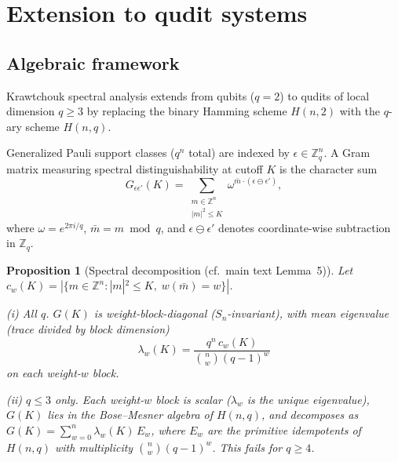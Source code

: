 \documentclass[twocolumn,prx,aps,superscriptaddress,longbibliography]{revtex4-2}
\newtheorem{proposition}{Proposition}
\newcommand{\pclaim}[4]{}
\begin{document}


\section{Extension to qudit systems}
\label{sec:qudit}

\subsection{Algebraic framework}
\label{sec:qudit-framework}

Krawtchouk spectral analysis extends from qubits ($q = 2$) to qudits
of local dimension $q \geq 3$ by replacing the binary Hamming
scheme $H(n,2)$ with the $q$-ary scheme $H(n,q)$.

Generalized Pauli support classes ($q^n$ total) are indexed by
$\epsilon \in \mathbb{Z}_q^n$.
A Gram matrix measuring spectral distinguishability at cutoff $K$
is the character sum
\begin{equation}
G_{\epsilon\epsilon'}(K)
= \sum_{\substack{m \in \mathbb{Z}^n \\ |m|^2 \leq K}}
   \omega^{\bar{m} \cdot (\epsilon \ominus \epsilon')},
\label{eq:gram_q}
\end{equation}
where $\omega = e^{2\pi i/q}$, $\bar{m} = m \bmod q$, and
$\epsilon \ominus \epsilon'$ denotes coordinate-wise subtraction
in $\mathbb{Z}_q$.

\pclaim{env:prop:spectral_q}{proved}{*}{prop:spectral_q}%
\begin{proposition}[Spectral decomposition (cf.\ main text Lemma~5)]
\label{prop:spectral_q}
Let $c_w(K) = |\{m \in \mathbb{Z}^n : |m|^2 \leq K,\;
w(\bar{m}) = w\}|$.

\noindent\emph{(i) All $q$.}\;
$G(K)$ is weight-block-diagonal ($S_n$-invariant), with
mean eigenvalue (trace divided by block dimension)
\begin{equation}
\lambda_w(K) = \frac{q^n \, c_w(K)}{\binom{n}{w}(q-1)^w}
\label{eq:eigenvalue_q}
\end{equation}
on each weight-$w$ block.

\noindent\emph{(ii) $q \le 3$ only.}\;
Each weight-$w$ block is scalar ($\lambda_w$ is the unique
eigenvalue), $G(K)$ lies in the Bose--Mesner algebra of $H(n,q)$,
and decomposes as
$G(K) = \sum_{w=0}^{n} \lambda_w(K)\, E_w$,
where $E_w$ are the primitive idempotents of $H(n,q)$ with
multiplicity $\binom{n}{w}(q-1)^w$.
This fails for $q \ge 4$.
\end{proposition}
\end{document}

